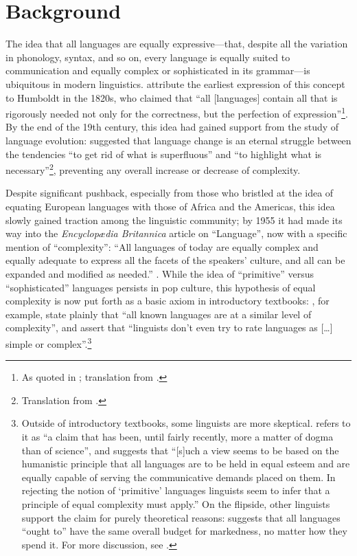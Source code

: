 \documentclass[12pt,twoside]{article}
\begin{document}
\section{Background}
\label{sec:bg}

The idea that all languages are equally expressive---that, despite all the variation in phonology, syntax, and so on, every language is equally suited to communication and equally complex or sophisticated in its grammar---is ubiquitous in modern linguistics. \citet{joseph} attribute the earliest expression of this concept to Humboldt in the 1820s, who claimed that ``all [languages] contain all that is rigorously needed not only for the correctness, but the perfection of expression''\footnote{As quoted in \cite[8]{rémusat}; translation from \cite[344]{joseph}.}. By the end of the 19th century, this idea had gained support from the study of language evolution: \citet[227]{passy} suggested that language change is an eternal struggle between the tendencies ``to get rid of what is superfluous'' and ``to highlight what is necessary''\footnote{Translation from \cite[352]{joseph}.}, preventing any overall increase or decrease of complexity.

Despite significant pushback, especially from those who bristled at the idea of equating European languages with those of Africa and the Americas, this idea slowly gained traction among the linguistic community; by 1955 it had made its way into the \emph{Encyclopædia Britannica} article on ``Language'', now with a specific mention of ``complexity'': ``All languages of today are equally complex and equally adequate to express all the facets of the speakers’ culture, and all can be expanded and modified as needed.'' \citep[698]{trager}. While the idea of ``primitive'' versus ``sophisticated'' languages persists in pop culture, this hypothesis of equal complexity is now put forth as a basic axiom in introductory textbooks: \citet[8]{akmajian}, for example, state plainly that ``all known languages are at a similar level of complexity'', and \citet[8]{ogrady} assert that ``linguists don't even try to rate languages as [\ldots{}] simple or complex''.\footnote{Outside of introductory textbooks, some linguists are more skeptical. \citet[2]{shosted} refers to it as ``a claim that has been, until fairly recently, more a matter of dogma than of science'', and \citet[216]{maddieson} suggests that ``[s]uch a view seems to be based on the humanistic principle that all languages are to be held in equal esteem and are equally capable of serving the communicative demands placed on them. In rejecting the notion of `primitive' languages linguists seem to infer that a principle of equal complexity must apply.'' On the flipside, other linguists support the claim for purely theoretical reasons: \citet[165-166]{chomsky} suggests that all languages ``ought to'' have the same overall budget for markedness, no matter how they spend it. For more discussion, see \citet{joseph}.}
\end{document}
